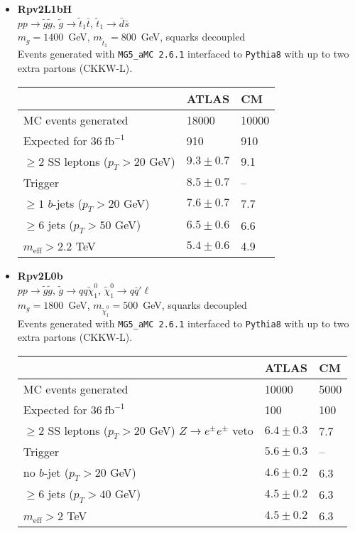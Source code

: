 \documentclass[10pt,fleqn]{article}
\newcommand{\meff}{m_\mathrm{eff}}
\begin{document}
\begin{itemize}
 
\item \textbf{Rpv2L1bH}\\ $ p p \to \tilde{g} \tilde{g} $, $\tilde{g} \to \tilde{t}_1 \bar{t}$, $\tilde{t}_1 \to \bar{d}\bar{s}$\\
 $m_{g} = 1400$~GeV, $m_{\tilde{t}_1} = 800$~GeV, squarks decoupled\\
 Events generated with \texttt{MG5\_aMC 2.6.1} interfaced to \texttt{Pythia8} with up to two extra partons (CKKW-L).
 \begin{tabular}{l|p{3cm}|p{3cm}} \toprule
                                           &  ATLAS           & CM  \\ \midrule
 MC events generated                       &  18000          & 10000 \\ \midrule
 Expected for $36\ \mathrm{fb}^{-1}$       &  910            & 910  \\
 $\geq 2$ SS leptons ($p_T > 20$ GeV)      & $9.3\pm 0.7$   &  9.1 \\
 Trigger                                   & $8.5 \pm 0.7$   &  --\\
 $\geq 1$ $b$-jets ($p_T > 20$ GeV)         & $7.6 \pm 0.7$   &  7.7\\
 $\geq 6$ jets ($p_T > 50$ GeV)            & $6.5 \pm 0.6$   &  6.6\\
 $\meff  > 2.2$ TeV                         & $5.4 \pm 0.6$   &  4.9\\   \bottomrule 
 \end{tabular}     
 
\item \textbf{Rpv2L0b}\\ $ p p \to \tilde{g} \tilde{g} $, $\tilde{g} \to qq\tilde{\chi}_1^0$, $\tilde{\chi}_1^0 \to q\bar{q}'\ell$\\
 $m_{g} = 1800$~GeV, $m_{\tilde{\chi}_1^0} = 500$~GeV, squarks decoupled\\
 Events generated with \texttt{MG5\_aMC 2.6.1} interfaced to \texttt{Pythia8} with up to two extra partons (CKKW-L).
 \begin{tabular}{l|p{3cm}|p{3cm}} \toprule
                                           &  ATLAS           & CM  \\ \midrule
 MC events generated                       &  10000          & 5000 \\ \midrule
 Expected for $36\ \mathrm{fb}^{-1}$       &  100            & 100  \\
 $\geq 2$ SS leptons ($p_T > 20$ GeV) $Z\to e^\pm e^\pm$ veto       & $6.4\pm 0.3$   & 7.7  \\
 Trigger                                   & $5.6 \pm 0.3$   &  --\\
 no $b$-jet ($p_T > 20$ GeV)               & $4.6 \pm 0.2$   &  6.3\\
 $\geq 6$ jets ($p_T > 40$ GeV)            & $4.5 \pm 0.2$   &  6.3\\
 $\meff  > 2$ TeV                         & $4.5 \pm 0.2$   &  6.3\\   \bottomrule 
 \end{tabular}      
 

\end{itemize}
\end{document}
